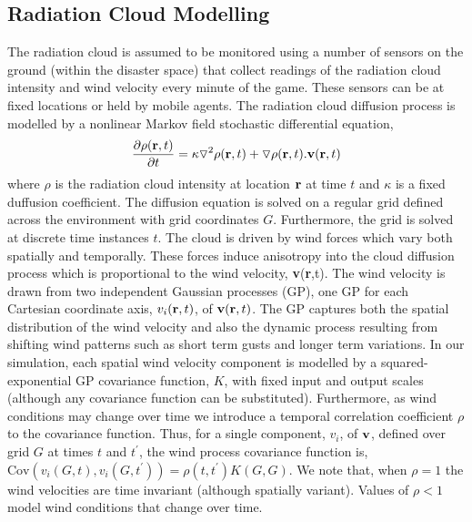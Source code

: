 \subsection{Radiation Cloud Modelling}
The radiation cloud is assumed to be monitored using a number of sensors on the ground (within the disaster space) that collect readings of the radiation cloud intensity and wind velocity every minute of the game. These sensors can be at fixed locations or held by mobile agents.  The radiation cloud diffusion process is modelled by a nonlinear Markov field stochastic differential equation,  
\begin{eqnarray*}
\frac{\partial \rho({\bf r}, t)}{\partial t}=\kappa \triangledown^2 \rho({\bf r},t)+\triangledown \rho({\bf r},t) . {\bf v}({\bf r},t)
\end{eqnarray*}
where $\rho$ is the radiation cloud intensity at location ${\bf r}$ at time $t$ and $\kappa$ is a fixed duffusion coefficient. The diffusion equation is solved on a regular grid defined across the environment with grid coordinates $G$.  Furthermore, the grid is solved at discrete time instances $t$.  The cloud is driven by wind forces which vary both spatially and temporally.  These forces induce anisotropy into the cloud diffusion process which is proportional to the wind velocity, {\bf v}({\bf r},t).  The wind velocity is drawn from two independent Gaussian processes (GP), one GP for each Cartesian coordinate axis, $v_i({\bf r},t)$, of ${\bf v}({\bf r},t)$.  The GP captures both the spatial distribution of the wind velocity and also the dynamic process resulting from shifting wind patterns such as short term gusts and longer term variations.  In our simulation, each spatial wind velocity component is modelled by a squared-exponential GP covariance function, $K$, with fixed input and output scales (although any covariance function can be substituted). Furthermore, as wind conditions may change over time we introduce a temporal correlation coefficient $\rho$ to the covariance function.  Thus, for a single component, $v_i$, of ${\bf v}$, defined over grid $G$ at times $t$ and $t^\prime$, the wind process covariance function is, $\text{Cov}(v_i(G,t),v_i(G,t^\prime))=\rho(t,t^\prime) K(G,G)$.  We note that, when $\rho=1$ the wind velocities are time invariant (although spatially variant).  Values of $\rho<1$ model wind conditions that change over time.



